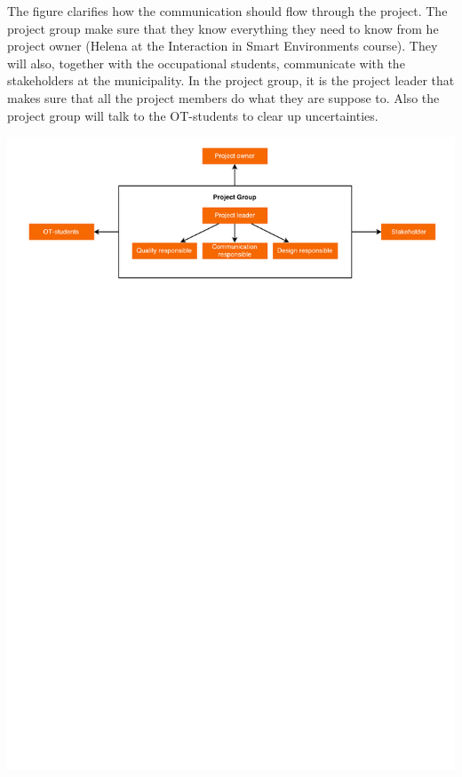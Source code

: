\documentclass[twoside]{report}
\begin{document}
\begin{rightsiderules}
The figure clarifies how the communication should flow through the project. The
project group make sure that they know everything they need to know from he
project owner (Helena at the Interaction in Smart Environments course). They
will also, together with the occupational students, communicate with the
stakeholders at the municipality. In the project group, it is the project leader
that makes sure that all the project members do what they are suppose to. Also
the project group will talk to the OT-students to clear up uncertainties.
\end{rightsiderules}
\includegraphics[width=\linewidth]{graphics/Organizationaldiagram.pdf} 



\newpage
\end{document}
